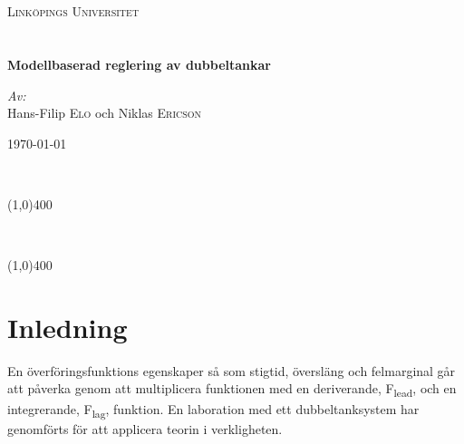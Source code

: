 \documentclass[a4wide]{article}
\begin{document}
\begin{titlepage}
\begin{center}


~\\
~\\
\textsc{\LARGE Link{\"o}pings Universitet}\\[1.5cm]


~\\
~\\
{ \huge \bfseries Modellbaserad reglering av dubbeltankar \\[0.4cm] }

\large
\emph{Av:}\\
Hans-Filip \textsc{Elo} och Niklas \textsc{Ericson}

\vfill

{\large \today}

\end{center}


\newpage
\thispagestyle{empty}
\tableofcontents
~\\

\begin{center}
\line(1,0){400}
\end{center}

\listoffigures
~\\

\begin{center}
\line(1,0){400}
\end{center}

\listoftables

\end{titlepage}
\pagestyle{fancy}

\fancyhead{} %
\fancyhead[R]{\today \slshape}

\fancyfoot{} %
\fancyfoot[L,R]{\thepage}



\section{Inledning}
En överföringsfunktions egenskaper så som stigtid, översläng och felmarginal går att påverka genom att multiplicera funktionen med en deriverande, F\textsubscript{lead}, och en integrerande, F\textsubscript{lag}, funktion. En laboration med ett dubbeltanksystem har genomförts för att applicera teorin i verkligheten.
\end{document}
